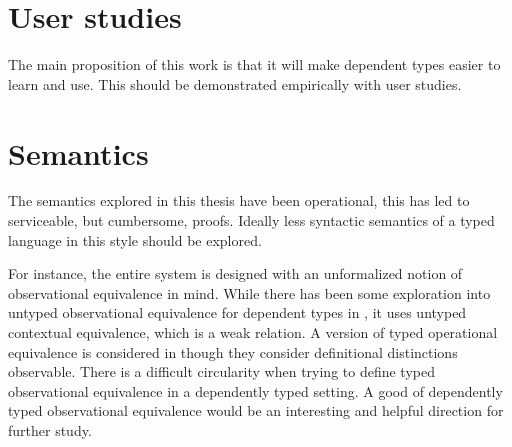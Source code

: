 \section{User studies}
 
The main proposition of this work is that it will make dependent types easier to learn and use.
This should be demonstrated empirically with user studies.
 
\section{Semantics}
 
The semantics explored in this thesis have been operational, this has led to serviceable, but cumbersome, proofs.
Ideally less syntactic semantics of a typed language in this style should be explored.
 
For instance, the entire system is designed with an unformalized notion of observational equivalence in mind.
While there has been some exploration into untyped observational equivalence for dependent types in \cite{sjoberg2015dependently,jia2010dependent}, it uses untyped contextual equivalence, which is a weak relation.
A version of typed operational equivalence is considered in \cite{VAKAR2018401} though they consider definitional distinctions observable. %
There is a difficult circularity when trying to define typed observational equivalence in a dependently typed setting.
A good of dependently typed observational equivalence would be an interesting and helpful direction for further study.
